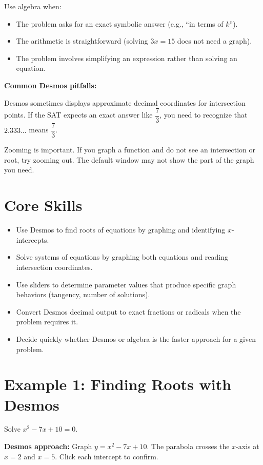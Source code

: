 \documentclass[14pt]{extarticle}
\begin{document}
Use algebra when:
\begin{itemize}
  \item The problem asks for an exact symbolic answer (e.g., ``in terms of \(k\)'').
  \item The arithmetic is straightforward (solving \(3x = 15\) does not need a graph).
  \item The problem involves simplifying an expression rather than solving an equation.
\end{itemize}

\textbf{Common Desmos pitfalls:}

Desmos sometimes displays approximate decimal coordinates for intersection points. If the SAT expects an exact answer like \(\dfrac{7}{3}\), you need to recognize that \(2.333...\) means \(\dfrac{7}{3}\).

Zooming is important. If you graph a function and do not see an intersection or root, try zooming out. The default window may not show the part of the graph you need.

\section*{Core Skills}
\begin{itemize}
  \item Use Desmos to find roots of equations by graphing and identifying \(x\)-intercepts.
  \item Solve systems of equations by graphing both equations and reading intersection coordinates.
  \item Use sliders to determine parameter values that produce specific graph behaviors (tangency, number of solutions).
  \item Convert Desmos decimal output to exact fractions or radicals when the problem requires it.
  \item Decide quickly whether Desmos or algebra is the faster approach for a given problem.
\end{itemize}

\section*{Example 1: Finding Roots with Desmos}

Solve \(x^2 - 7x + 10 = 0\).

\textbf{Desmos approach:} Graph \(y = x^2 - 7x + 10\). The parabola crosses the \(x\)-axis at \(x = 2\) and \(x = 5\). Click each intercept to confirm.
\end{document}
